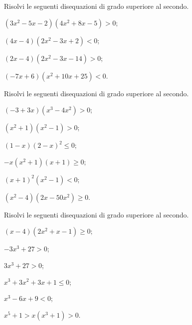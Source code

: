 \begin{esercizio}[\Ast]
 \label{ese:4.49}
Risolvi le seguenti disequazioni di grado superiore al secondo.
\begin{multicols}{2}
\begin{enumeratea}
\item $(3x^2-5x-2)(4x^2+8x-5)>0$;
\item $(4x-4)(2x^2-3x+2)<0$;
\item $(2x-4)(2x^2-3x-14)>0$;
\item $(-7x+6)(x^2+10x+25)<0$.
\end{enumeratea}
\end{multicols}
\end{esercizio}

\begin{esercizio}[\Ast]
 \label{ese:4.50}
Risolvi le seguenti disequazioni di grado superiore al secondo.
\begin{multicols}{2}
\begin{enumeratea}
\item $(-3+3x)(x^3-4x^2)>0$;
\item $\left(x^2+1\right)\left(x^2-1\right)>0$;
\item $(1-x)(2-x)^2\le 0$;
\item $-x\left(x^2+1\right)(x+1)\ge 0$;
\item $(x+1)^2\left(x^2-1\right)<0$;
\item $(x^2-4)(2x-50x^2)\ge 0$.
\end{enumeratea}
\end{multicols}
\end{esercizio}

\begin{esercizio}[\Ast]
 \label{ese:4.51}
Risolvi le seguenti disequazioni di grado superiore al secondo.
\begin{multicols}{2}
\begin{enumeratea}
\item $(x-4)(2x^2+x-1)\ge 0$;
\item $-3x^3+27>0$;
\item $3x^3+27>0$;
\item $x^3+3x^2+3x+1\le 0$;
\item $x^3-6x+9<0$;
\item $x^5+1>x\left(x^3+1\right)>0$.
\end{enumeratea}
\end{multicols}
\end{esercizio}

